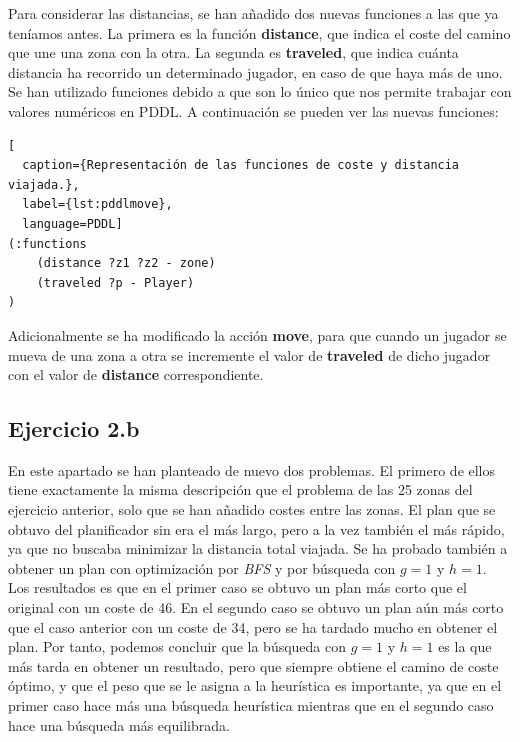 \documentclass[11pt,a4paper]{article}
\begin{document}
Para considerar las distancias, se han añadido dos nuevas funciones a las que ya teníamos antes. La primera es la función
\textbf{distance}, que indica el coste del camino que une una zona con la otra. La segunda es \textbf{traveled}, que indica
cuánta distancia ha recorrido un determinado jugador, en caso de que haya más de uno. Se han utilizado funciones debido a que
son lo único que nos permite trabajar con valores numéricos en PDDL. A continuación se pueden ver las nuevas funciones:

\begin{algorithm}[H]
\begin{lstlisting}[
  caption={Representación de las funciones de coste y distancia viajada.},
  label={lst:pddlmove},
  language=PDDL]
(:functions
    (distance ?z1 ?z2 - zone)
    (traveled ?p - Player)
)
\end{lstlisting}
\end{algorithm}

Adicionalmente se ha modificado la acción \textbf{move}, para que cuando un jugador se mueva de una zona a otra se incremente el
valor de \textbf{traveled} de dicho jugador con el valor de \textbf{distance} correspondiente.

\subsection{Ejercicio 2.b}

En este apartado se han planteado de nuevo dos problemas. El primero de ellos tiene exactamente la misma descripción que el problema
de las 25 zonas del ejercicio anterior, solo que se han añadido costes entre las zonas. El plan que se obtuvo del planificador sin
era el más largo, pero a la vez también el más rápido, ya que no buscaba minimizar la distancia total viajada. Se ha probado también a
obtener un plan con optimización por \textit{BFS} y por búsqueda con $g = 1$ y $h = 1$. Los resultados es que en el primer caso se
obtuvo un plan más corto que el original con un coste de 46. En el segundo caso se obtuvo un plan aún más corto que el caso anterior
con un coste de 34, pero se ha tardado mucho en obtener el plan. Por tanto, podemos concluir que la búsqueda con $g = 1$ y $h = 1$ es
la que más tarda en obtener un resultado, pero que siempre obtiene el camino de coste óptimo, y que el peso que se le asigna a la
heurística es importante, ya que en el primer caso hace más una búsqueda heurística mientras que en el segundo caso hace una búsqueda
más equilibrada.
\end{document}
